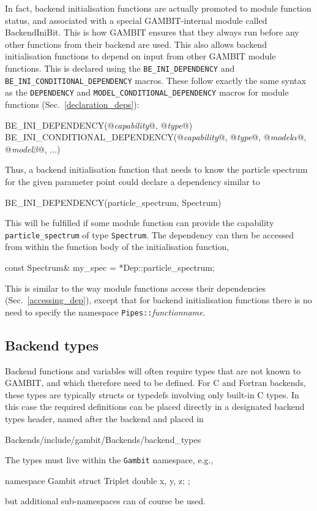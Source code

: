 \documentclass[pdftex,twocolumn,epjc3_preprint,runningheads]{svjour3}
\renewcommand{\_}{\discretionary{\underscore}{}{\underscore}}
\newcommand\cpp[1]{{\lstinline!#1!}}  %
\newcommand{\metavarf}[1]{\textit{\color{darkgreen}\footnotesize\textrm{#1}}}
\newcommand{\metavar}{\metavarf}
\newcommand{\gambit}{\textsf{GAMBIT}\xspace}
\newcommand{\GB}{\gambit}
\newcommand\plainC{\textsf{C}\xspace}
\newcommand\Fortran{\textsf{Fortran}\xspace}
\begin{document}
In fact, backend initialisation functions are actually promoted to module function status, and associated with a special \GB-internal module called \textsf{BackendIniBit}.  This is how \GB ensures that they always run before any other functions from their backend are used.  This also allows backend initialisation functions to depend on input from other \GB module functions. This is declared using the \lstinline|BE_INI_DEPENDENCY| and \lstinline|BE_INI_CONDITIONAL_DEPENDENCY| macros.  These follow exactly the same syntax as the \lstinline|DEPENDENCY| and \lstinline|MODEL_CONDITIONAL_DEPENDENCY| macros for module functions (Sec.\ \ref{declaration_deps}):
\begin{lstcpp}
BE_INI_DEPENDENCY(@\metavar{capability}@, @\metavar{type}@)
BE_INI_CONDITIONAL_DEPENDENCY(@\metavar{capability}@, @\metavar{type}@, @\metavar{model\_$\alpha$}@, @\metavar{model\_$\beta$}@, ...)
\end{lstcpp}
Thus, a backend initialisation function that needs to know the particle spectrum for the given parameter point could declare a dependency similar to
\begin{lstcpp}
BE_INI_DEPENDENCY(particle_spectrum, Spectrum)
\end{lstcpp}
This will be fulfilled if some module function can provide the capability \lstinline|particle_spectrum| of type \mbox{\lstinline|Spectrum|}. The dependency can then be accessed from within the function body of the initialisation function,
\begin{lstcpp}
const Spectrum& my_spec = *Dep::particle_spectrum;
\end{lstcpp}
This is similar to the way module functions access their dependencies (Sec.\ \ref{accessing_dep}), except that for backend initialisation functions there is no need to specify the namespace \cpp{Pipes::}\metavar{function\_name}.


\subsection{Backend types}
\label{backend_types}

Backend functions and variables will often require types that are not known to \GB, and which therefore need to be defined. For \plainC and \Fortran backends, these types are typically structs or typedefs involving only built-in \plainC types. In this case the required definitions can be placed directly in a designated backend types header, named after the backend and placed in
\begin{lstterm}
Backends/include/gambit/Backends/backend_types
\end{lstterm}
The types must live within the \lstinline|Gambit| namespace, e.g.,
\begin{lstcpp}
namespace Gambit
{
  struct Triplet
  {
    double x, y, z;
  };
}
\end{lstcpp}
but additional sub-namespaces can of course be used.
\end{document}
